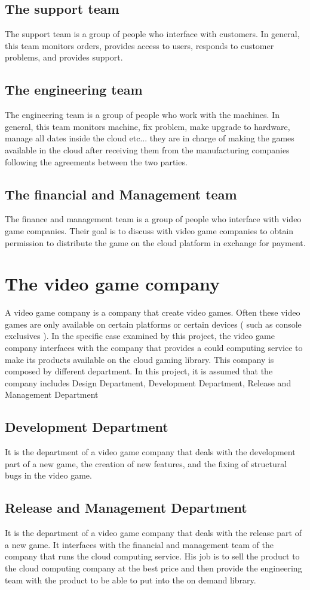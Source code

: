 \documentclass[a4paper,12pt]{report}
\begin{document}
\subsection{The support team }
The support team is a group of people who interface with customers. In general, this team monitors orders, provides access to users, responds to customer problems, and provides support.
%
\subsection{The engineering team }
The engineering team is a group of people who work with the machines. In general, this team monitors machine, fix problem, make upgrade to hardware, manage all dates inside the cloud etc... they are in charge of making the games available in the cloud after receiving them from the manufacturing companies following the agreements between the two parties.
%
\subsection{The financial and Management team }
The finance and management team is a group of people who interface with video game companies. Their goal is to discuss with video game companies to obtain permission to distribute the game on the cloud platform in exchange for payment.  
%
\section{The video game company  }
A video game company  is a company that create video games. Often these video games are only available on certain platforms or certain devices ( such as console exclusives ). In the specific case examined by this project, the video game company interfaces with the company that provides a could computing service to make its products available on the cloud gaming library. This company is composed by different department. In this project, it is assumed that the  company includes Design Department, Development Department, Release and Management Department
%
\subsection{Development Department }
It is the department of a video game company that deals with the development part of a new game, the creation of new features, and the fixing of structural bugs in the video game.
%
\subsection{Release and Management Department }
It is the department of a video game company that deals with the release part of a new game. It interfaces with the financial and management team of the company that runs the cloud computing service. His job is to sell the product to the cloud computing company at the best price and then provide the engineering team with the product to be able to put into the on demand library.
%
%
\end{document}
